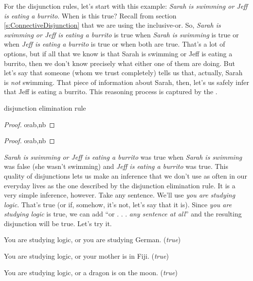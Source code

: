 For the disjunction rules, let's start with this example: \textit{Sarah is swimming or Jeff is eating a burrito}. When is this true? Recall from section \ref{s:ConnectiveDisjunction} that we are using the inclusive-or. So, \textit{Sarah is swimming or Jeff is eating a burrito} is true when \textit{Sarah is swimming} is true or when \textit{Jeff is eating a burrito} is true or when both are true. That's a lot of options, but if all that we know is that Sarah is swimming or Jeff is eating a burrito, then we don't know precisely what either one of them are doing. But let's say that someone (whom we trust completely) tells us that, actually, Sarah is \textit{not} swimming. That piece of information about Sarah, then, let's us safely infer that Jeff is eating a burrito. This reasoning process is captured by the .

\begin{factboxy}{disjunction elimination rule}
\begin{proof}
	 \oe{ab,nb}
\end{proof}

\begin{proof}
	 \oe{ab,nb}
\end{proof}
\end{factboxy}

\textit{Sarah is swimming or Jeff is eating a burrito} was true when \textit{Sarah is swimming} was false (she wasn't swimming) and \textit{Jeff is eating a burrito} was true. This quality of disjunctions lets us make an inference that we don't use as often in our everyday lives as the one described by the disjunction elimination rule. It is a very simple inference, however. Take any sentence. We'll use \textit{you are studying logic}. That's true (or if, somehow, it's not, let's say that it is). Since \textit{you are studying logic} is true, we can add ``or . . . \textit{any sentence at all}'' and the resulting disjunction will be true. Let's try it.

\begin{ebullet}
	\item[] You are studying logic, or you are studying German. (\textit{true})
	\item[] You are studying logic, or your mother is in Fiji. (\textit{true})
	\item[] You are studying logic, or a dragon is on the moon. (\textit{true})
\end{ebullet}

